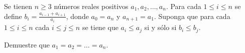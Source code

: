 Se tienen $n\geq 3$ números reales positivos $a_1,a_2,\dots,a_n$. Para cada $1\leq i\leq n$ se define $b_i=\frac{a_{i-1}+a_{i+1}}{a_i}$, donde $a_0=a_n$ y $a_{n+1}=a_1$. Suponga que para cada $1\leq i\leq n$ cada $i\leq j\leq n$ se tiene que $a_i\leq a_j$ si y sólo si $b_i\leq b_j$.  \newline 

Demuestre que $a_1=a_2=\dots =a_n$.